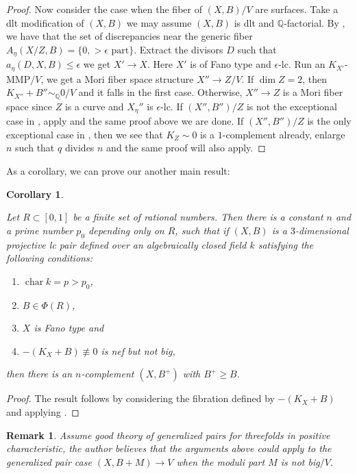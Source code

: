 \documentclass[letterpaper,reqno,12pt]{amsart}
\DeclareMathOperator{\chara}{char}
\numberwithin{equation}{section}
\theoremstyle{plain}
\newtheorem{corollary}[theorem]{Corollary}
\newtheorem{remark}{Remark}[section]
\begin{document}
\begin{proof}
    Now consider the case when the fiber of $(X,B)/V$ are surfaces. Take a dlt modification of $(X,B)$ we may assume $(X,B)$ is dlt and ${\mathbb Q}$-factorial. By , we have that the set of discrepancies near the generic fiber $A_\eta(X/Z,B)=\{0,>\epsilon\text{ part}\}$. Extract the divisors $D$ such that $a_\eta(D,X,B)\leq \epsilon$ we get $X'\to X$. Here $X'$ is of Fano type and $\epsilon$-lc. Run an $K_{X'}$-MMP$/V$, we get a Mori fiber space structure $X''\to Z/V$. If $\dim Z=2$, then $K_{X''}+B''\sim_{\mathbb Q}0/V$ and it falls in the first case. Otherwise, $X''\to Z$ is a Mori fiber space since $Z$ is a curve and $X_\eta''$ is $\epsilon$-lc. If $(X'',B'')/Z$ is not the exceptional case in , apply  and the same proof above we are done. If $(X'',B'')/Z$ is the only exceptional case in , then we see that $K_Z\sim0$ is a $1$-complement already, enlarge $n$ such that $q$ divides $n$ and the same proof will also apply.
\end{proof}
As a corollary, we can prove our another main result:
\begin{corollary}
\label{fibcomp2}
    

    Let $R\subset [0,1]$ be a finite set of rational numbers. Then there is a constant $n$ and a prime number $p_0$ depending only on $R$, such that if $(X,B)$ is a $3$-dimensional projective lc pair defined over an algebraically closed field $k$ satisfying the following conditions:
    \begin{enumerate}
        \item $\chara k=p>p_0$,
        \item $B\in \Phi(R)$,
        \item $X$ is Fano type and
        \item $-(K_X+B)\not\equiv0$ is nef but not big,
    \end{enumerate}
    then there is an $n$-complement $(X,B^+)$ with $B^+\geq B$.
\end{corollary}
\begin{proof}
    The result follows by considering the fibration defined by $-(K_X+B)$ and applying .
\end{proof}
\begin{remark}
    Assume good theory of generalized pairs for threefolds in positive characteristic, the author believes that the arguments above could apply to the generalized pair case $(X,B+M)\to V$ when the moduli part $M$ is not big$/V$.
\end{remark}
\end{document}

